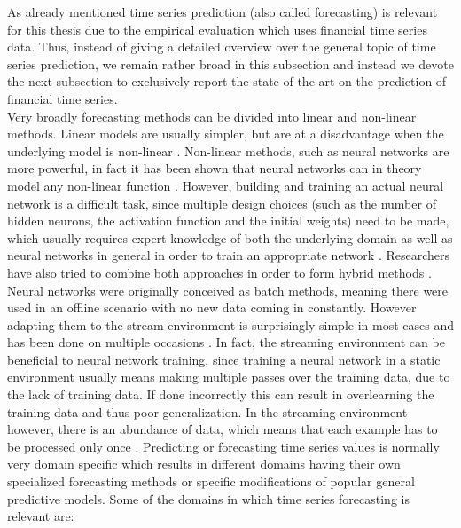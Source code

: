 As already mentioned time series prediction (also called forecasting) is relevant for this thesis due to the empirical evaluation which uses financial time series data. Thus, instead of giving a detailed overview over the general topic of time series prediction, we remain rather broad in this subsection and instead we devote the next subsection to exclusively report the state of the art on the prediction of financial time series. \\
Very broadly forecasting methods can be divided into linear and non-linear methods. Linear models are usually simpler, but are at a disadvantage when the underlying model is non-linear \cite{zhang2003time}. Non-linear methods, such as neural networks are more powerful, in fact it has been shown that neural networks can in theory model any non-linear function \cite{abraham2005artificial} \cite{funahashi1989approximate}. However, building and training an actual neural network is a difficult task, since multiple design choices (such as the number of hidden neurons, the activation function and the initial weights) need to be made, which usually requires expert knowledge of both the underlying domain as well as neural networks in general in order to train an appropriate network \cite{abraham2005artificial}. Researchers have also tried to combine both approaches in order to form hybrid methods \cite{zhang2003time}. \newline
Neural networks were originally conceived as batch methods, meaning there were used in an offline scenario with no new data coming in constantly. However adapting them to the stream environment is surprisingly simple in most cases and has been done on multiple occasions \cite{chang2002real} \cite{frank2001time}. In fact, the streaming environment can be beneficial to neural network training, since training a neural network in a static environment usually means making multiple passes over the training data, due to the lack of training data. If done incorrectly this can result in overlearning the training data and thus poor generalization. In the streaming environment however, there is an abundance of data, which means that each example has to be processed only once \cite{gama2010knowledge}. \newline
Predicting or forecasting time series values is normally very domain specific which results in different domains having their own specialized forecasting methods or specific modifications of popular general predictive models. Some of the domains in which time series forecasting is relevant are:

